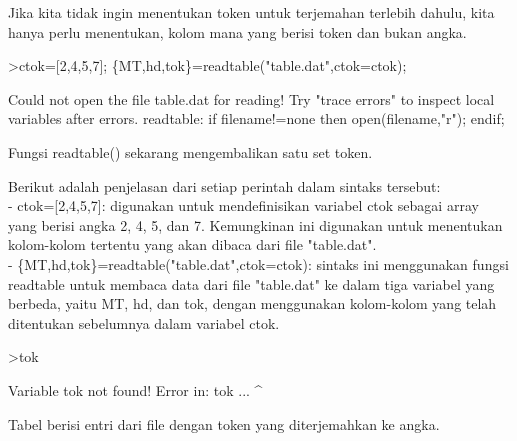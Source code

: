 \documentclass[a4paper,10pt]{article}
\begin{document}
\begin{eulernotebook}
\begin{eulercomment}
\begin{eulercomment}
\begin{eulercomment}
\begin{eulercomment}
\begin{eulercomment}
\begin{eulercomment}
\begin{eulercomment}
\begin{eulercomment}
\begin{eulercomment}
\begin{eulercomment}
\begin{eulercomment}
\begin{eulercomment}
\begin{eulercomment}
\begin{eulercomment}
\begin{eulercomment}
\begin{eulercomment}
\begin{eulercomment}
\begin{eulercomment}
\begin{eulercomment}
Jika kita tidak ingin menentukan token untuk terjemahan terlebih
dahulu, kita hanya perlu menentukan, kolom mana yang berisi token dan
bukan angka.
\end{eulercomment}
\begin{eulerprompt}
>ctok=[2,4,5,7]; \{MT,hd,tok\}=readtable("table.dat",ctok=ctok);
\end{eulerprompt}
\begin{euleroutput}
  Could not open the file
  table.dat
  for reading!
  Try "trace errors" to inspect local variables after errors.
  readtable:
      if filename!=none then open(filename,"r"); endif;
\end{euleroutput}
\begin{eulercomment}
Fungsi readtable() sekarang mengembalikan satu set token.

Berikut adalah penjelasan dari setiap perintah dalam sintaks tersebut:\\
- ctok=[2,4,5,7]: digunakan untuk mendefinisikan variabel ctok sebagai
array yang berisi angka 2, 4, 5, dan 7. Kemungkinan ini digunakan
untuk menentukan kolom-kolom tertentu yang akan dibaca dari file
"table.dat".\\
- \{MT,hd,tok\}=readtable("table.dat",ctok=ctok): sintaks ini
menggunakan fungsi readtable untuk membaca data dari file "table.dat"
ke dalam tiga variabel yang berbeda, yaitu MT, hd, dan tok, dengan
menggunakan kolom-kolom yang telah ditentukan sebelumnya dalam
variabel ctok.
\end{eulercomment}
\begin{eulerprompt}
>tok
\end{eulerprompt}
\begin{euleroutput}
  Variable tok not found!
  Error in:
  tok ...
     ^
\end{euleroutput}
\begin{eulercomment}
Tabel berisi entri dari file dengan token yang diterjemahkan ke angka.


\end{eulercomment}
\end{eulercomment}
\end{eulercomment}
\end{eulercomment}
\end{eulercomment}
\end{eulercomment}
\end{eulercomment}
\end{eulercomment}
\end{eulercomment}
\end{eulercomment}
\end{eulercomment}
\end{eulercomment}
\end{eulercomment}
\end{eulercomment}
\end{eulercomment}
\end{eulercomment}
\end{eulercomment}
\end{eulercomment}
\end{eulercomment}
\end{eulernotebook}
\end{document}
